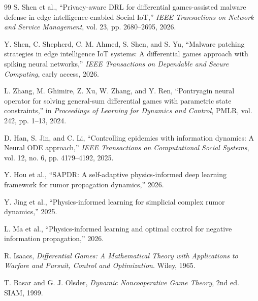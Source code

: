 \documentclass[11pt,a4paper]{article}
\begin{document}
\begin{thebibliography}{99}
S. Shen et al., ``Privacy-aware DRL for differential games-assisted malware defense in edge intelligence-enabled Social IoT,'' \emph{IEEE Transactions on Network and Service Management}, vol. 23, pp. 2680--2695, 2026.

Y. Shen, C. Shepherd, C. M. Ahmed, S. Shen, and S. Yu, ``Malware patching strategies in edge intelligence IoT systems: A differential games approach with spiking neural networks,'' \emph{IEEE Transactions on Dependable and Secure Computing}, early access, 2026.

L. Zhang, M. Ghimire, Z. Xu, W. Zhang, and Y. Ren, ``Pontryagin neural operator for solving general-sum differential games with parametric state constraints,'' in \emph{Proceedings of Learning for Dynamics and Control}, PMLR, vol. 242, pp. 1--13, 2024.

D. Han, S. Jin, and C. Li, ``Controlling epidemics with information dynamics: A Neural ODE approach,'' \emph{IEEE Transactions on Computational Social Systems}, vol. 12, no. 6, pp. 4179--4192, 2025.

Y. Hou et al., ``SAPDR: A self-adaptive physics-informed deep learning framework for rumor propagation dynamics,'' 2026.

Y. Jing et al., ``Physics-informed learning for simplicial complex rumor dynamics,'' 2025.

L. Ma et al., ``Physics-informed learning and optimal control for negative information propagation,'' 2026.


R. Isaacs, \emph{Differential Games: A Mathematical Theory with Applications to Warfare and Pursuit, Control and Optimization}. Wiley, 1965.

T. Basar and G. J. Olsder, \emph{Dynamic Noncooperative Game Theory}, 2nd ed. SIAM, 1999.

\end{thebibliography}
\end{document}
